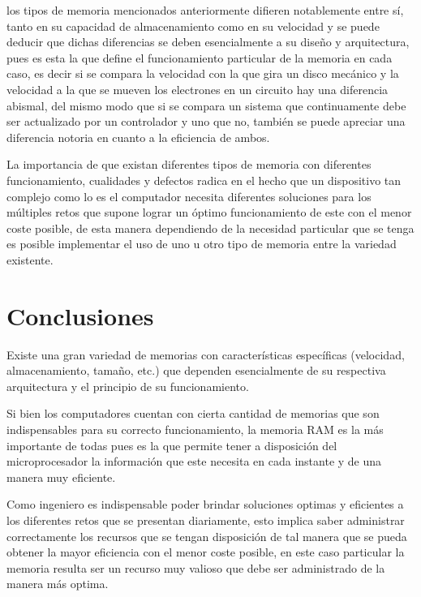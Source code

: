 \documentclass{article}
\begin{document}
los tipos de memoria mencionados anteriormente  difieren notablemente entre sí, tanto en su capacidad de almacenamiento como en su velocidad y se puede deducir que dichas diferencias se deben esencialmente a su diseño y arquitectura, pues es esta la que define el funcionamiento particular de la memoria en cada caso, es decir si se compara la velocidad con la que gira un disco mecánico y la velocidad a la que se mueven los electrones en un circuito hay una diferencia abismal, del mismo modo que si se compara un sistema que continuamente debe ser actualizado por un controlador y uno que no, también se puede apreciar una diferencia notoria en cuanto a la eficiencia de ambos.

\vspace{0.5cm}

La importancia de que existan diferentes tipos de memoria con diferentes funcionamiento, cualidades y defectos radica en el hecho que un dispositivo tan complejo como lo es el computador necesita diferentes soluciones para los múltiples retos que supone lograr un óptimo funcionamiento de este con el menor coste posible, de esta manera dependiendo de la necesidad particular que se tenga es posible implementar el uso de uno u otro tipo de memoria entre la variedad existente.


\section{Conclusiones} \label{contenido}

Existe una gran variedad de memorias con características específicas (velocidad, almacenamiento, tamaño, etc.) que dependen esencialmente de su respectiva arquitectura y el principio de su funcionamiento.

Si bien los computadores cuentan con cierta cantidad de memorias que son indispensables para su correcto funcionamiento, la memoria RAM es la más importante de todas pues es la que permite tener a disposición del microprocesador la información que este necesita en cada instante y de una manera muy eficiente.

Como ingeniero es indispensable poder brindar soluciones optimas y eficientes a los diferentes retos que se presentan diariamente, esto implica saber administrar correctamente los recursos que se tengan disposición de tal manera que se pueda obtener la mayor eficiencia con el menor coste posible, en este caso particular la memoria resulta ser un recurso muy valioso que debe ser administrado de la manera más optima.



\end{document}
